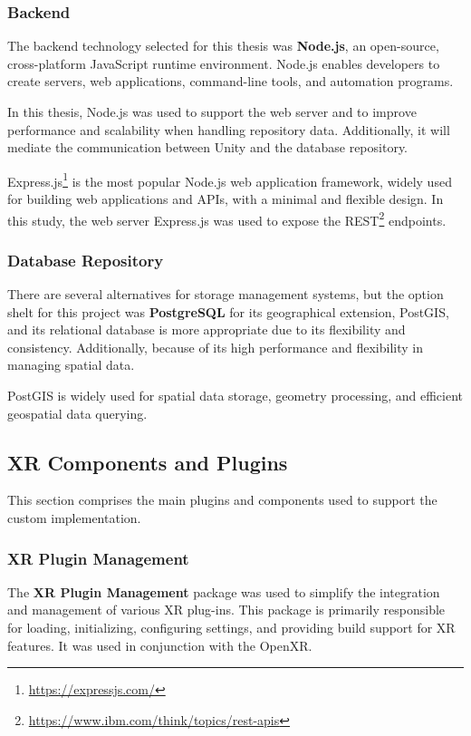 \subsubsection{Backend}

The backend technology selected for this thesis was \textbf{Node.js}, an open-source, cross-platform JavaScript runtime environment. 
Node.js enables developers to create servers, web applications, command-line tools, and automation programs.

In this thesis, Node.js was used to support the web server and to improve performance and scalability when handling repository data. 
Additionally, it will mediate the communication between Unity and the database repository.

Express.js\footnote{\url{https://expressjs.com/}} is the most popular Node.js web application framework, widely used for building web applications and \glspl{API}, with a minimal and flexible design.
In this study, the web server Express.js was used to expose the \gls{REST}\footnote{\url{https://www.ibm.com/think/topics/rest-apis}} endpoints.


\subsubsection{Database Repository}
\label{sec:repos}

There are several alternatives for storage management systems, but the option shelt for this project was \textbf{PostgreSQL} for its geographical extension, PostGIS, and its relational database is more appropriate due to its flexibility and consistency.
Additionally, because of its high performance and flexibility in managing spatial data. 

PostGIS is widely used for spatial data storage, geometry processing, and efficient geospatial data querying.

\subsection{XR Components and Plugins}
This section comprises the main plugins and components used to support the custom implementation.
\subsubsection{XR Plugin Management}
The \textbf{XR Plugin Management} package was used to simplify the integration and management of various XR plug-ins. 
This package is primarily responsible for loading, initializing, configuring settings, and providing build support for XR features. 
It was used in conjunction with the OpenXR.

